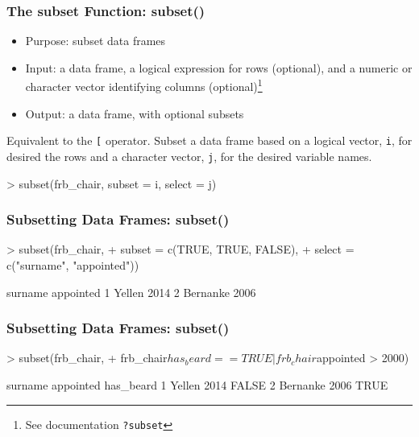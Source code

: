\documentclass{beamer}
\newcommand{\R}[1]{\texttt{#1}}
\begin{document}
\begin{frame}[fragile]
\frametitle{The subset Function: subset()}

\begin{itemize}
\item Purpose: subset data frames
\item Input: a data frame, a logical expression for rows (optional), and a numeric or character vector identifying columns (optional)\footnote{See documentation \R{?subset}}
\item Output: a data frame, with optional subsets
\end{itemize}

Equivalent to the \R{[} operator. Subset a data frame based on a logical vector, \R{i}, for desired the rows and a character vector, \R{j}, for the desired variable names.

\begin{Schunk}
\begin{Sinput}
> subset(frb_chair, subset = i, select = j) 
\end{Sinput}
\end{Schunk}
\end{frame}



\begin{frame}[fragile]
\frametitle{Subsetting Data Frames: subset()}

\begin{Schunk}
\begin{Sinput}
> subset(frb_chair, 
+        subset = c(TRUE, TRUE, FALSE), 
+        select = c("surname", "appointed")) 
\end{Sinput}
\end{Schunk}
\pause
\begin{Schunk}
\begin{Soutput}
   surname appointed
1   Yellen      2014
2 Bernanke      2006
\end{Soutput}
\end{Schunk}
\end{frame}



\begin{frame}[fragile]
\frametitle{Subsetting Data Frames: subset()}

\begin{Schunk}
\begin{Sinput}
> subset(frb_chair, 
+        frb_chair$has_beard == TRUE | frb_chair$appointed > 2000) 
\end{Sinput}
\end{Schunk}
\pause
\begin{Schunk}
\begin{Soutput}
   surname appointed has_beard
1   Yellen      2014     FALSE
2 Bernanke      2006      TRUE
\end{Soutput}
\end{Schunk}
\end{frame}
\end{document}
